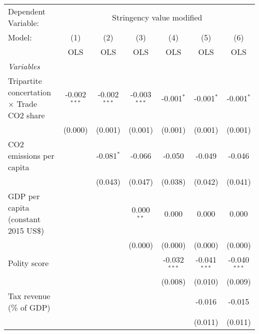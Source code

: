 
\begingroup
\centering
\begin{tabular}{lcccccc}
   \toprule
   Dependent Variable: & \multicolumn{6}{c}{Stringency value modified}\\
   Model:                                            & (1)            & (2)            & (3)            & (4)            & (5)            & (6)\\  
                                                     &  OLS           & OLS            & OLS            & OLS            & OLS            & OLS\\  
   \midrule
   \emph{Variables}\\
   Tripartite concertation $\times$ Trade CO2 share  & -0.002$^{***}$ & -0.002$^{***}$ & -0.003$^{***}$ & -0.001$^{*}$   & -0.001$^{*}$   & -0.001$^{*}$\\   
                                                     & (0.000)        & (0.001)        & (0.001)        & (0.001)        & (0.001)        & (0.001)\\   
   CO2 emissions per capita                          &                & -0.081$^{*}$   & -0.066         & -0.050         & -0.049         & -0.046\\   
                                                     &                & (0.043)        & (0.047)        & (0.038)        & (0.042)        & (0.041)\\   
   GDP per capita (constant 2015 US\$)               &                &                & 0.000$^{**}$   & 0.000          & 0.000          & 0.000\\   
                                                     &                &                & (0.000)        & (0.000)        & (0.000)        & (0.000)\\   
   Polity score                                      &                &                &                & -0.032$^{***}$ & -0.041$^{***}$ & -0.040$^{***}$\\   
                                                     &                &                &                & (0.008)        & (0.010)        & (0.009)\\   
   Tax revenue (\% of GDP)                           &                &                &                &                & -0.016         & -0.015\\   
                                                     &                &                &                &                & (0.011)        & (0.011)\\   

\end{tabular}
